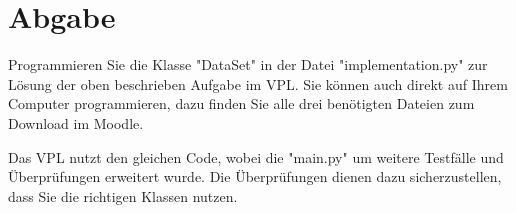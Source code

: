 \documentclass[
 12pt, %
 a4paper, %
 parskip=full %
]{scrartcl}
\begin{document}
    \section{Abgabe}
    Programmieren Sie die Klasse "DataSet" in der Datei "implementation.py" zur Lösung der oben beschrieben Aufgabe im VPL.
    Sie können auch direkt auf Ihrem Computer programmieren, dazu finden Sie alle drei benötigten Dateien zum Download im Moodle.
    
    Das VPL nutzt den gleichen Code, wobei die "main.py" um weitere Testfälle und Überprüfungen erweitert wurde.
    Die Überprüfungen dienen dazu sicherzustellen, dass Sie die richtigen Klassen nutzen.
\end{document}
